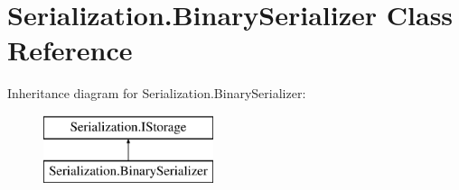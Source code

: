 \hypertarget{class_serialization_1_1_binary_serializer}{}\section{Serialization.\+Binary\+Serializer Class Reference}
\label{class_serialization_1_1_binary_serializer}
Inheritance diagram for Serialization.\+Binary\+Serializer\+:\begin{figure}[H]
\begin{center}
\leavevmode
\includegraphics[height=2.000000cm]{class_serialization_1_1_binary_serializer}
\end{center}
\end{figure}
